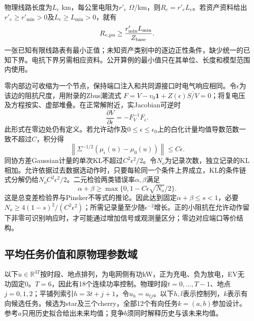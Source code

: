 \documentclass[UTF8,fontset=fandol,11pt,a4paper]{ctexart}
\newcommand{\R}{\mathbb R}
\newcommand{\norm}[1]{\left\lVert#1\right\rVert}
\begin{document}
物理线路长度为$L_e$ km，每公里电阻为$r'_e$ $\Omega$/km，则$R_e=r'_eL_e$。若资产资料给出$r'_e\ge r'_{\min}>0$及$L_e\ge L_{\min}>0$，就有
\begin{equation}
R_{e,\mathrm{pu}}\ge \frac{r'_{\min}L_{\min}}{Z_{\rm base}}.
\label{eq:original-rfloor}
\end{equation}
一张已知有限线路表有最小正值；未知资产类别中的逐边正性条件，缺少统一的已知下界。电抗下界另需相应资料。公开算例的最小值只在其单位、长度和模型范围内使用。

零内部边可收缩为一个节点，保持端口注入和共同源接口时电气响应相同。令$\epsilon$为该边的阻抗尺度，用附录的Zbus潮流式
$F=V-v_0\mathbf1+Z(\epsilon)\overline{S/V}=0$；将复电压及方程按实、虚部堆叠。在正常解附近，实Jacobian可逆时
\[
\frac{\partial V}{\partial\epsilon}=-F_V^{-1}F_\epsilon.
\]
此形式在零边处仍有定义。若允许动作及$0\le\epsilon\le\epsilon_0$上的白化计量均值导数范数一致不超过$C$，积分得
\[
\norm{\Sigma^{-1/2}(\mu_\epsilon(u)-\mu_0(u))}\le C\epsilon.
\]
同协方差Gaussian计量的单次KL不超过$C^2\epsilon^2/2$。令$N_o$为记录次数，独立记录的KL相加。允许依据过去数据选动作时，只要每轮同一个条件上界成立，KL的条件链式分解仍给$N_oC^2\epsilon^2/2$。二元检验两类错误率$\alpha,\beta$满足
\begin{equation}
\alpha+\beta\ge \max\{0,1-C\epsilon\sqrt{N_o}/2\}.
\label{eq:original-zero-edge}
\end{equation}
这是总变差检验界与Pinsker不等式的推论。因此达到固定$\alpha+\beta\le s<1$，必要$N_o\ge4(1-s)^2/(C^2\epsilon^2)$；所需记录量至少随$\epsilon^{-2}$增长。正的小阻抗在允许动作留下非零可识别响应时，才可能通过增加信号或观测量区分；零边对应端口等价结构。

\subsection{平均任务价值和原物理参数域}
以下$u\in\R^{3T}$按时段、地点排列，为电网侧有功kW，正为充电、负为放电，EV无功固定0。$T=6$，因此有18个连续功率控制。物理时段$t=0,\ldots,T-1$、地点$j=0,1,2$；平铺列索引$h=3t+j+1$，令$u_h=u_{tj}$。以下$h,l$表示控制列，$k$表示有向候选任务。候选为star及三个cherry，全部12个有向任务$k=(a,b)$参加设计。参考$a$只用历史拟合给出未来均值；竞争$b$须同时解释历史与该未来均值。
\end{document}
